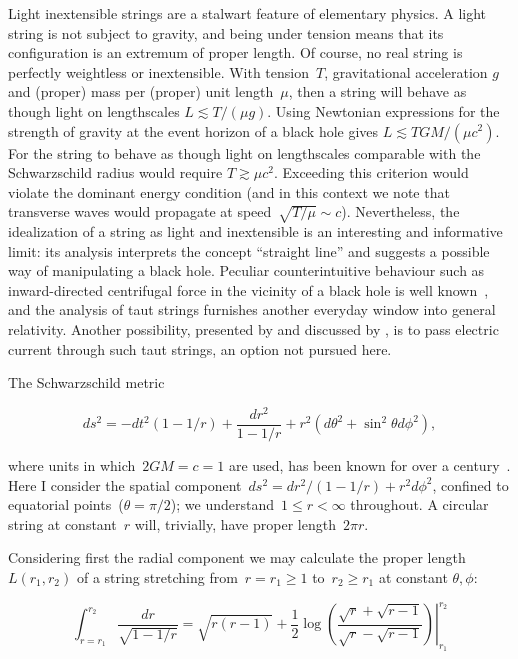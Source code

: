 \documentclass[prb,preprint]{revtex4-1}
\begin{document}
\label{intro}
Light inextensible strings are a stalwart feature of elementary
physics.  A light string is not subject to gravity, and being under
tension means that its configuration is an extremum of proper length.
Of course, no real string is perfectly weightless or inextensible.
With tension~$T$, gravitational acceleration $g$ and (proper) mass per
(proper) unit length~$\mu$, then a string will behave as though light
on lengthscales $L\lesssim T/\left(\mu g\right)$.  Using Newtonian
expressions for the strength of gravity at the event horizon of a
black hole gives $L\lesssim TGM/\left(\mu c^2\right)$.  For the string
to behave as though light on lengthscales comparable with the
Schwarzschild radius would require $T\gtrsim\mu c^2$.  Exceeding this
criterion would violate the dominant energy condition (and in this
context we note that transverse waves would propagate at
speed~$\sqrt{T/\mu}\sim c$).  Nevertheless, the idealization of a
string as light and inextensible is an interesting and informative
limit: its analysis interprets the concept ``straight line'' and
suggests a possible way of manipulating a black hole.  Peculiar
counterintuitive behaviour such as inward-directed centrifugal force
in the vicinity of a black hole is well
known~\citep{abramowicz1992,abramowicz1993}, and the analysis of taut
strings furnishes another everyday window into general relativity.
Another possibility, presented by \citet{damour1978} and discussed by
\citet{thorne1986}, is to pass electric current through such taut
strings, an option not pursued here.

The Schwarzschild metric

\begin{equation}\label{schwarzschild}
ds^2= -dt^2\left(1-1/r\right) +\frac{dr^2}{1-1/r} + r^2\left(d\theta^2 + \sin^2\theta d\phi^2\right),
\end{equation}

\noindent where units in which~$2GM=c=1$ are used, has been known for
over a century~\cite{schwarzschild1916}.  Here I consider the spatial
component~$ds^2= dr^2/\left(1-1/r\right) + r^2d\phi^2$, confined to
equatorial points~($\theta=\pi/2$); we understand~$1\leq r<\infty$
throughout.  A circular string at constant~$r$ will, trivially, have
proper length~$2\pi r$.

Considering first the radial component we may calculate the
proper length $L\left(r_1,r_2\right)$ of a string stretching
from~$r=r_1\geq 1$ to~$r_2\geq r_1$ at constant $\theta,\phi$:

\begin{equation}\label{radial_string_length}
  \int_{r=r_1}^{r_2}\frac{dr}{\sqrt{1-1/r}}=
  \left.
  \sqrt{r(r-1)} +\frac{1}{2}\log\left(
  \frac{\sqrt{r}+\sqrt{r-1}}{\sqrt{r}-\sqrt{r-1}}\right)
  \right|_{r_1}^{r_2}
  \end{equation}
\end{document}
